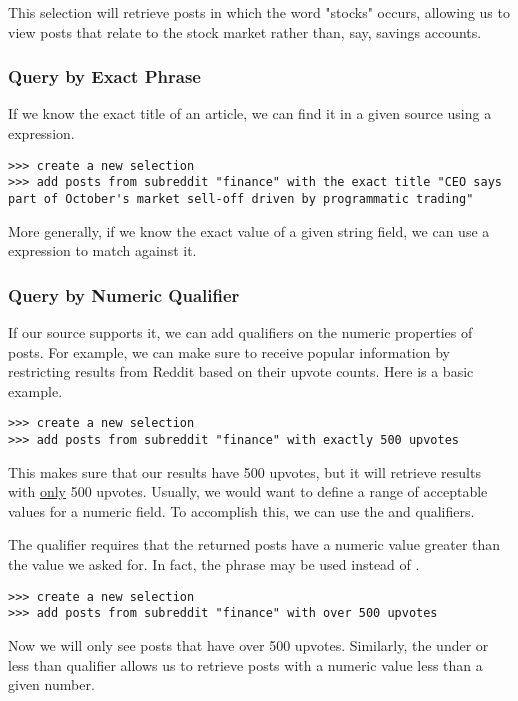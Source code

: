 This selection will retrieve posts in which the word "stocks" occurs, allowing us to view posts that relate to the stock market rather than, say, savings accounts.


\subsubsection{Query by Exact Phrase}
If we know the exact title of an article, we can find it in a given source using a  expression.
\newline\begin{minipage}{\linewidth}\begin{lstlisting}
>>> create a new selection
>>> add posts from subreddit "finance" with the exact title "CEO says part of October's market sell-off driven by programmatic trading"
\end{lstlisting}\end{minipage}

More generally, if we know the exact value of a given string field, we can use a  expression to match against it.



\subsubsection{Query by Numeric Qualifier}
If our source supports it, we can add qualifiers on the numeric properties of posts. For example, we can make sure to receive popular information by restricting results from Reddit based on their upvote counts. Here is a basic example.
\newline\begin{minipage}{\linewidth}\begin{lstlisting}
>>> create a new selection
>>> add posts from subreddit "finance" with exactly 500 upvotes
\end{lstlisting}\end{minipage}
This makes sure that our results have 500 upvotes, but it will retrieve results with \underline{only} 500 upvotes. Usually, we would want to define a range of acceptable values for a numeric field. To accomplish this, we can use the  and  qualifiers.

The  qualifier requires that the returned posts have a numeric value greater than the value we asked for. In fact, the phrase  may be used instead of .
\newline\begin{minipage}{\linewidth}\begin{lstlisting}
>>> create a new selection
>>> add posts from subreddit "finance" with over 500 upvotes
\end{lstlisting}\end{minipage}
Now we will only see posts that have over 500 upvotes. Similarly, the under or less than qualifier allows us to retrieve posts with a numeric value less than a given number.

